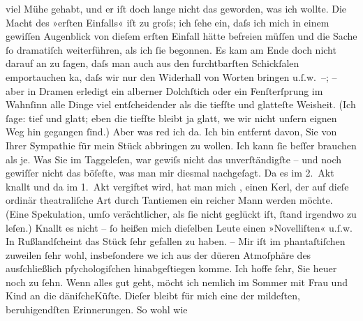 \begin{ledgroupsized}[t]{13cm}
               viel Mühe gehabt, und er iſt doch lange nicht das geworden, was ich wollte. Die Macht
               des »erſten Einfalls« iſt zu groſs; ich ſehe ein, daſs ich {\pb}mich in einem gewiſſen Augenblick von dieſem
               erſten Einfall hätte befreien \introOben{}müſſen\introOben{} und die Sache ſo
               dramatiſch weiterführen, als ich ſie begonnen. Es kam am Ende doch nicht darauf an zu
               ſagen, daſs man auch aus den furchtbarſten Schickſalen emportauchen ka{\geminationn}, daſs wir nur den Widerhall von Worten bringen
               u.ſ.w. –; – aber in Dramen erledigt ein alberner Dolchſtich {\pb}oder ein Fenſterſprung im Wahnſinn alle Dinge viel
               entſcheidender als die tiefſte und glatteſte Weisheit. (Ich ſage: tief und glatt;
               eben die tiefſte bleibt ja glatt, we{\geminationn} wir nicht unſern
               eignen Weg hin gegangen ſind.) Aber was red ich da. Ich bin entfernt davon, Sie von
               Ihrer Sympathie für mein Stück abbringen zu wollen. Ich kann ſie beſſer brauchen als
               je. Was Sie im Taggeleſen, war {\pb}gewiſs nicht das unverſtändigſte – und noch
               gewiſſer nicht das böſeſte, was man mir diesmal nachgeſagt. Da es im 2. Akt knallt
               und da im 1. Akt vergiftet wird, hat man mich \label{K_L01590-1v}\label{K_L01590-1h}, einen Kerl, der auf dieſe ordinär
               theatraliſche Art durch Tantiemen ein reicher Mann werden möchte. (Eine Spekulation,
               umſo verächtlicher, als ſie nicht geglückt iſt, ſtand irgendwo zu {\pb}leſen.) Knallt es nicht – ſo heißen mich dieſelben
               Leute einen »Novelliſten« u.ſ.w. In Rußlandſcheint das Stück ſehr gefallen zu haben. – Mir iſt
               im phantaſtiſchen zuweilen ſehr wohl, insbeſondere we{\geminationn}
               ich aus der dü{\geminationn}eren Atmoſphäre des ausſchließlich
               pſychologiſchen hinabgeſtiegen komme.\pend
           \pstart
           Ich hoffe ſehr, Sie heuer noch zu ſehn. Wenn alles gut geht, möcht ich nemlich im
               Sommer mit Frau und Kind an die däniſcheKüſte. Dieſer \label{K_L01590-2v}\label{K_L01590-2h} bleibt für mich eine der mildeſten, beruhigendſten Erinnerungen. So wohl wie

\end{ledgroupsized}
